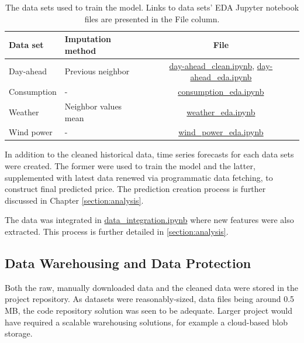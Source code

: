 \documentclass{article}
\begin{document}
\begin{table}[b] 
\centering 
\begin{tabular}{l||l c} 
Data set & Imputation method & File\\ 
\hline \hline
Day-ahead & Previous neighbor & \href{https://github.com/IDS-mini/electricity/blob/main/data/day-ahead_clean.ipynb}{day-ahead\_clean.ipynb},  \href{https://github.com/IDS-mini/electricity/blob/main/data/day-ahead_eda.ipynb}{day-ahead\_eda.ipynb}\\
Consumption & - & \href{https://github.com/IDS-mini/electricity/blob/main/data/consumption_eda.ipynb}{consumption\_eda.ipynb} \\
Weather & Neighbor values mean & \href{https://github.com/IDS-mini/electricity/blob/main/data/weather_eda.ipynb}{weather\_eda.ipynb} \\
Wind power & - & \href{https://github.com/IDS-mini/electricity/blob/main/data/wind_power_eda.ipynb}{wind\_power\_eda.ipynb}\\
\hline
\end{tabular}
\caption{The data sets used to train the model. Links to data sets' EDA Jupyter notebook files are presented in the File column.}
\label{table:eda}
\end{table}

In addition to the cleaned historical data, time series forecasts for each data sets were created. The former were used to train the model and the latter, supplemented with latest data renewed via programmatic data fetching, to construct final predicted price. The prediction creation process is further discussed in Chapter \ref{section:analysis}. 

The data was integrated in \href{https://github.com/IDS-mini/electricity/blob/main/data/data_integration.ipynb}{data\_integration.ipynb} where new features were also extracted. This process is further detailed in \ref{section:analysis}.

\subsection{Data Warehousing and Data Protection}
\label{subsection:warehousing}

Both the raw, manually downloaded data and the cleaned data were stored in the project repository. As datasets were reasonably-sized, data files being around 0.5 MB, the code repository solution was seen to be adequate. Larger project would have required a scalable warehousing solutions, for example a cloud-based blob storage.
\end{document}
